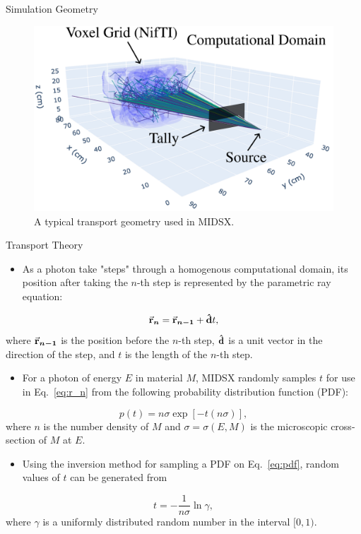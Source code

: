 \documentclass[final]{beamer}
\newlength{\colwidth}
\begin{document}
\begin{frame}[t]
\begin{columns}[t]
\begin{column}{\colwidth}
\begin{block}{Simulation Geometry}
    \begin{figure}
      \centering
      \includegraphics[width = 0.7\colwidth]{comp_domain.pdf}
      \caption{A typical transport geometry used in MIDSX.}
    \end{figure}
    \vspace{-\baselineskip}
  \end{block}

  \begin{block}{Transport Theory}
    \begin{itemize}
      \item As a photon take "steps" through a homogenous computational domain, its position after taking the $n$-th step is represented by the parametric ray equation:
    \end{itemize}
    \begin{equation} \label{eq:r_n}
        \va{r}_{\bm{n}} = \va{r}_{\bm{n-1}} + \vu{d}t,
    \end{equation}
    where $\va{r}_{\bm{n-1}}$ is the position before the $n$-th step, $\vu{d}$ is a unit vector in the direction of the step, and $t$ is the length of the $n$-th step.
    \begin{itemize}
      \item For a photon of energy $E$ in material $M$, MIDSX randomly samples $t$ for use in Eq.~\ref{eq:r_n} from the following probability distribution function (PDF):
    \end{itemize}
    \begin{equation} \label{eq:pdf}
      p(t) = n\sigma \exp\left[-t(n\sigma)\right],
    \end{equation}
    where $n$ is the number density of $M$ and $\sigma = \sigma(E, M)$ is the microscopic cross-section of $M$ at $E$.
    \begin{itemize}
      \item Using the inversion method for sampling a PDF on Eq.~\ref{eq:pdf}, random values of $t$ can be generated from
    \end{itemize}
    \begin{equation} \label{eq:t_inv}
      t = -\frac{1}{n\sigma} \ln \gamma, 
    \end{equation}
    where $\gamma$ is a uniformly distributed random number in the interval $[0, 1)$.


\end{block}
\end{column}
\end{columns}
\end{frame}
\end{document}
